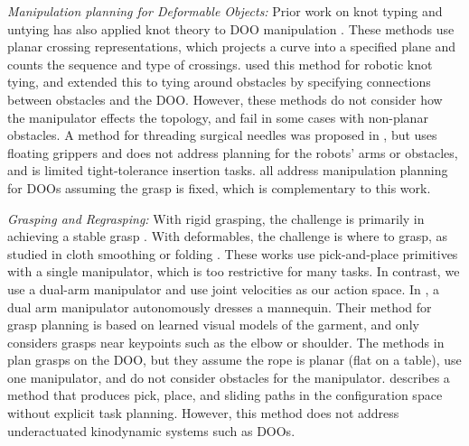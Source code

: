 \textit{Manipulation planning for Deformable Objects:}
Prior work on knot typing and untying has also applied knot theory to DOO manipulation \cite{WakamatsuKnots2005, Wakamatsu2006Untangling, Saha07, WeifuKnots, UntanglingHulk, Sundaresan2020, UntanglingFull}. These methods use planar crossing representations, which projects a curve into a specified plane and counts the sequence and type of crossings. \cite{Saha07} used this method for robotic knot tying, and extended this to tying around obstacles by specifying connections between obstacles and the DOO. However, these methods do not consider how the manipulator effects the topology, and fail in some cases with non-planar obstacles. A method for threading surgical needles was proposed in \cite{Weifu}, but uses floating grippers and does not address planning for the robots' arms or obstacles, and is limited tight-tolerance insertion tasks. \cite{TetheredToolManipulation, UnreliableMitrano2021, UnreliableDale2019, DataAugmentation2022, FOCUS2023} all address manipulation planning for DOOs assuming the grasp is fixed, which is complementary to this work.

\textit{Grasping and Regrasping:}
With rigid grasping, the challenge is primarily in achieving a stable grasp \cite{DexNet1,DexNet2}. With deformables, the challenge is where to grasp, as studied in cloth smoothing or folding \cite{HoqueCloth2020,ZixuanCloth21,ClothSmoothingWu}. These works use pick-and-place primitives with a single manipulator, which is too restrictive for many tasks. In contrast, we use a dual-arm manipulator and use joint velocities as our action space. In \cite{Zhang2022}, a dual arm manipulator autonomously dresses a mannequin. Their method for grasp planning is based on learned visual models of the garment, and only considers grasps near keypoints such as the elbow or shoulder. The methods in \cite{RitaCableRouting,Nair2017,CFM} plan grasps on the DOO, but they assume the rope is planar (flat on a table), use one manipulator, and do not consider obstacles for the manipulator. \cite{Simeon04} describes a method that produces pick, place, and sliding paths in the configuration space without explicit task planning. However, this method does not address underactuated kinodynamic systems such as DOOs.